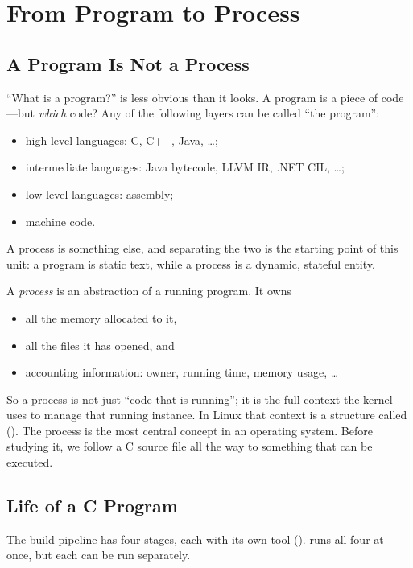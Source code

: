 \section{From Program to Process}
\label{sec:program}

\subsection{A Program Is Not a Process}

``What is a program?'' is less obvious than it looks. A program is a piece of code---but \emph{which} code? Any of the following layers can be called ``the program'':
\begin{itemize}
  \item high-level languages: C, C++, Java, \dots;
  \item intermediate languages: Java bytecode, LLVM IR, .NET CIL, \dots;
  \item low-level languages: assembly;
  \item machine code.
\end{itemize}
A process is something else, and separating the two is the starting point of this unit: a program is static text, while a process is a dynamic, stateful entity.

\begin{definition}[Process]
  A \emph{process} is an abstraction of a running program. It owns
  \begin{itemize}
    \item all the memory allocated to it,
    \item all the files it has opened, and
    \item accounting information: owner, running time, memory usage, \dots
  \end{itemize}
\end{definition}

So a process is not just ``code that is running''; it is the full context the kernel uses to manage that running instance. In Linux that context is a structure called \ts{} (). The process is the most central concept in an operating system. Before studying it, we follow a C source file all the way to something that can be executed.

\subsection{Life of a C Program}

The build pipeline has four stages, each with its own tool ().  runs all four at once, but each can be run separately.

